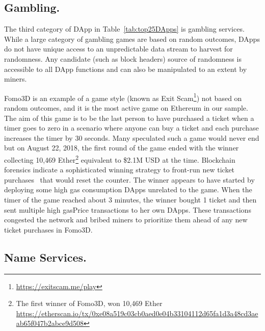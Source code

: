 
\subsection{Gambling.} 

The third category of DApp in Table~\ref{tab:top25DApps} is gambling services. While a large category of gambling games are based on random outcomes, DApps do not have unique access to an unpredictable data stream to harvest for randomness. Any candidate (such as block headers) source of randomness is accessible to all DApp functions and can also be manipulated to an extent by miners.

\textsf{Fomo3D} is an example of a game style (known as \textsf{Exit Scam}\footnote{\url{https://exitscam.me/play}}) not based on random outcomes, and it is the most active game on Ethereum in our sample. The aim of this game is to be the last person to have purchased a ticket when a timer goes to zero in a scenario where anyone can buy a ticket and each purchase increases the timer by 30 seconds. Many speculated such a game would never end but on August 22, 2018, the first round of the game ended with the winner collecting 10,469 Ether\footnote{The first winner of Fomo3D, won 10,469 Ether \url{ https://etherscan.io/tx/0xe08a519c03cb0aed0e04b33104112d65fa1d3a48cd3aeab65f047b2abce9d508}} equivalent to \$2.1M USD at the time. 
Blockchain forensics indicate a sophisticated winning strategy to front-run new ticket purchases~\cite{fomo3dhacker} that would reset the counter. The winner appears to have started by deploying some high gas consumption DApps unrelated to the game. When the timer of the game reached about 3 minutes, the winner bought 1 ticket and then sent multiple high gasPrice transactions to her own DApps. These transactions congested the network and bribed miners to prioritize them ahead of any new ticket purchases in \textsf{Fomo3D}. 



\subsection{Name Services.}\label{sec:ens}

